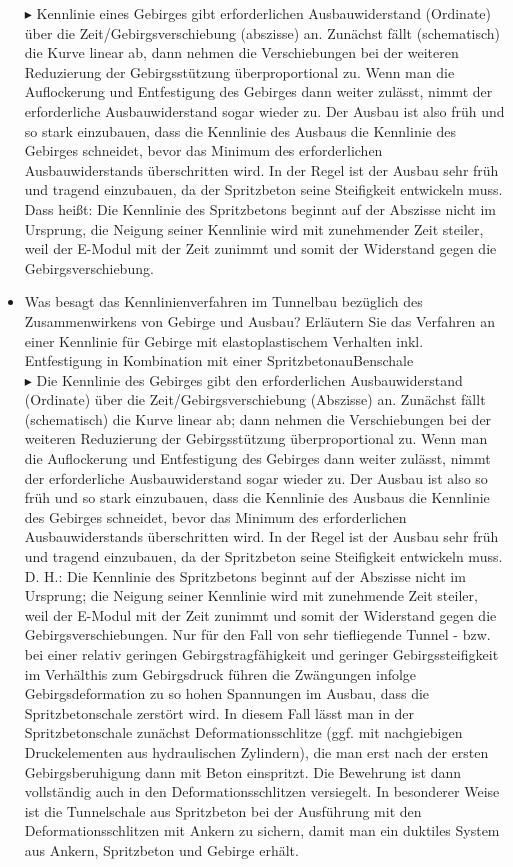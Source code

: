 \documentclass[fleqn,twoside]{article}
\begin{document}
\begin{small}
\begin{itemize}
    $\blacktriangleright$ Kennlinie eines Gebirges gibt erforderlichen Ausbauwiderstand (Ordinate) über die Zeit/Gebirgsverschiebung (abszisse) an. Zunächst fällt (schematisch) die Kurve linear ab, dann nehmen die Verschiebungen bei der weiteren Reduzierung der Gebirgsstützung überproportional zu. Wenn man die Auflockerung und Entfestigung des Gebirges dann weiter zulässt, nimmt der erforderliche Ausbauwiderstand sogar wieder zu. Der Ausbau ist also früh und so stark einzubauen, dass die Kennlinie des Ausbaus die Kennlinie des Gebirges schneidet, bevor das Minimum des erforderlichen Ausbauwiderstands überschritten wird. In der Regel ist der Ausbau sehr früh und tragend einzubauen, da der Spritzbeton seine Steifigkeit entwickeln muss. Dass heißt: Die Kennlinie des Spritzbetons beginnt auf der Abszisse nicht im Ursprung, die Neigung seiner Kennlinie wird mit zunehmender Zeit steiler, weil der E-Modul mit der Zeit zunimmt und somit der Widerstand gegen die Gebirgsverschiebung.
    \item Was besagt das Kennlinienverfahren im Tunnelbau bezüglich des Zusammenwirkens von Gebirge und Ausbau? Erläutern Sie das Verfahren an einer Kennlinie für Gebirge mit elastoplastischem Verhalten inkl. Entfestigung in Kombination mit einer SpritzbetonauBenschale\\
    $\blacktriangleright$ Die Kennlinie des Gebirges gibt den erforderlichen Ausbauwiderstand (Ordinate) über die Zeit/Gebirgsverschiebung (Abszisse) an. Zunächst fällt (schematisch) die Kurve linear ab; dann nehmen die Verschiebungen bei der weiteren Reduzierung der Gebirgsstützung überproportional zu. Wenn man die Auflockerung und Entfestigung des Gebirges dann weiter zulässt, nimmt der erforderliche Ausbauwiderstand sogar wieder zu. Der Ausbau ist also so früh und so stark einzubauen, dass die Kennlinie des Ausbaus die Kennlinie des Gebirges schneidet, bevor das Minimum des erforderlichen Ausbauwiderstands überschritten wird. In der Regel ist der Ausbau sehr früh und tragend einzubauen, da der Spritzbeton seine Steifigkeit entwickeln muss. D. H.: Die Kennlinie des Spritzbetons beginnt auf der Abszisse nicht im Ursprung; die Neigung seiner Kennlinie wird mit zunehmende Zeit steiler, weil der E-Modul mit der Zeit zunimmt und somit der Widerstand gegen die Gebirgsverschiebungen. Nur für den Fall von sehr tiefliegende Tunnel - bzw. bei einer relativ geringen Gebirgstragfähigkeit und geringer Gebirgssteifigkeit im Verhälthis zum Gebirgsdruck führen die Zwängungen infolge Gebirgsdeformation zu so hohen Spannungen im Ausbau, dass die Spritzbetonschale zerstört wird. In diesem Fall lässt man in der Spritzbetonschale zunächst Deformationsschlitze (ggf. mit nachgiebigen Druckelementen aus hydraulischen Zylindern), die man erst nach der ersten Gebirgsberuhigung dann mit Beton einspritzt. Die Bewehrung ist dann vollständig auch in den Deformationsschlitzen versiegelt. In besonderer Weise ist die Tunnelschale aus Spritzbeton bei der Ausführung mit den Deformationsschlitzen mit Ankern zu sichern, damit man ein duktiles System aus Ankern, Spritzbeton und Gebirge erhält.

\end{itemize}
\end{small}
\end{document}
